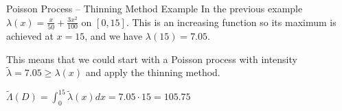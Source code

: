 \documentclass[8pt]{beamer}
\begin{document}
\begin{frame}[fragile]{Poisson Process -- Thinning Method Example}
In the previous example $\displaystyle{\lambda(x)=\frac{x}{50}+\frac{3x^2}{100}}$ on $[0,15]$. This is an increasing function so its maximum is achieved at $x=15$, and we have $\lambda(15)=7.05$.

\vspace{2mm}

This means that we could start with a Poisson process with intensity 
$\tilde{\lambda}=7.05 \geq \lambda(x)$ and apply the thinning method.

\vspace{2mm}

$\displaystyle{\tilde{\Lambda}(D)=\int_0^{15} \tilde{\lambda}(x) dx=7.05 \cdot 15=105.75}$
\end{frame}

%





\end{document}
